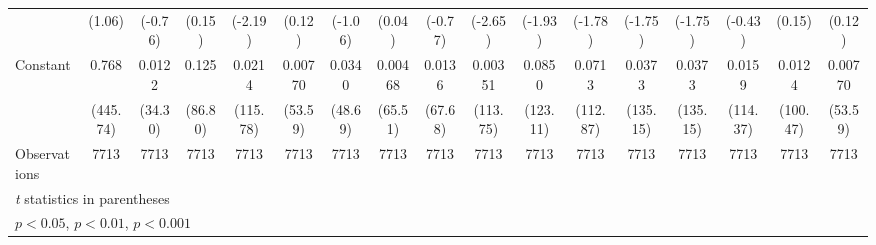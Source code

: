 \begin{table}[htbp]
\begin{tabular}{l*{16}{c}}
                    &      (1.06)         &     (-0.76)         &      (0.15)         &     (-2.19)         &      (0.12)         &     (-1.06)         &      (0.04)         &     (-0.77)         &     (-2.65)         &     (-1.93)         &     (-1.78)         &     (-1.75)         &     (-1.75)         &     (-0.43)         &      (0.15)         &      (0.12)         \\
\addlinespace
Constant            &       0.768\sym{***}&      0.0122\sym{***}&       0.125\sym{***}&      0.0214\sym{***}&     0.00770\sym{***}&      0.0340\sym{***}&     0.00468\sym{***}&      0.0136\sym{***}&     0.00351\sym{***}&      0.0850\sym{***}&      0.0713\sym{***}&      0.0373\sym{***}&      0.0373\sym{***}&      0.0159\sym{***}&      0.0124\sym{***}&     0.00770\sym{***}\\
                    &    (445.74)         &     (34.30)         &     (86.80)         &    (115.78)         &     (53.59)         &     (48.69)         &     (65.51)         &     (67.68)         &    (113.75)         &    (123.11)         &    (112.87)         &    (135.15)         &    (135.15)         &    (114.37)         &    (100.47)         &     (53.59)         \\
\midrule
Observations        &        7713         &        7713         &        7713         &        7713         &        7713         &        7713         &        7713         &        7713         &        7713         &        7713         &        7713         &        7713         &        7713         &        7713         &        7713         &        7713         \\
\bottomrule
\multicolumn{17}{l}{\footnotesize \textit{t} statistics in parentheses}\\
\multicolumn{17}{l}{\footnotesize \sym{*} \(p<0.05\), \sym{**} \(p<0.01\), \sym{***} \(p<0.001\)}\\
\end{tabular}
\end{table}

